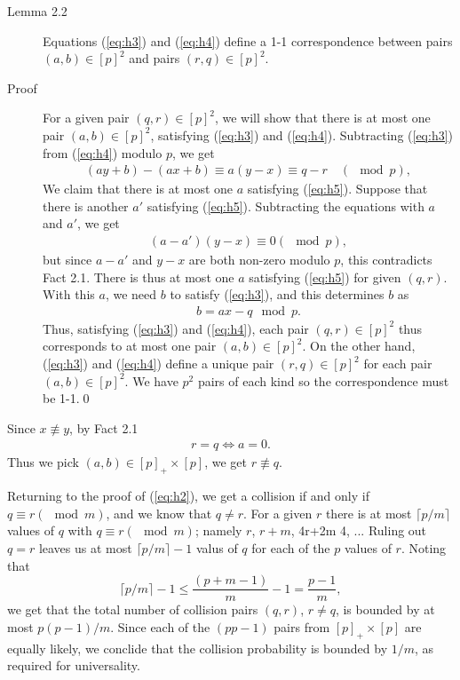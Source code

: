 \begin{description}
\item[Lemma 2.2] Equations (\ref{eq:h3}) and (\ref{eq:h4}) define a 1-1
  correspondence between pairs $(a,b)\in [p]^2$ and pairs $(r,q)\in[p]^2$.
\item[Proof] For a given pair $(q,r) \in [p]^2$, we will show that there is at
  most one pair $(a,b) \in [p]^2$, satisfying (\ref{eq:h3}) and (\ref{eq:h4}).
  Subtracting (\ref{eq:h3}) from (\ref{eq:h4}) modulo $p$, we get
  \begin{align}
    (ay+b) - (ax+b) \equiv a(y-x) \equiv q-r \quad (\mod p), \label{eq:h5}
  \end{align}
  We claim that there is at most one $a$ satisfying (\ref{eq:h5}). Suppose that
  there is another $a'$ satisfying (\ref{eq:h5}).  Subtracting the equations
  with $a$ and $a'$, we get
  \begin{align*}
    (a-a')(y-x) \equiv 0 (\mod p),
  \end{align*}
  but since $a-a'$ and $y-x$ are both non-zero modulo $p$, this contradicts Fact
  2.1. There is thus at most one $a$ satisfying (\ref{eq:h5}) for given
  $(q,r)$. With this $a$, we need $b$ to satisfy (\ref{eq:h3}), and this
  determines $b$ as
  \begin{align}
    b = ax-q\mod p. \label{eq:h6}
  \end{align}
  Thus, satisfying (\ref{eq:h3}) and (\ref{eq:h4}), each pair $(q,r)\in [p]^2$
  thus corresponds to at most one pair $(a,b)\in [p]^2$. On the other hand,
  (\ref{eq:h3}) and (\ref{eq:h4}) define a unique pair $(r,q)\in[p]^2$ for each
  pair $(a,b)\in [p]^2$. We have $p^2$ pairs of each kind so the correspondence
  must be 1-1.\qed
\end{description}

Since $x \not\equiv y$, by Fact 2.1
\begin{align}
  r = q \Longleftrightarrow a = 0. \label{eq:h7}
\end{align}
Thus we pick $(a,b) \in [p]_+ \times [p]$, we get $r \not\equiv q$.

Returning to the proof of (\ref{eq:h2}), we get a collision if and only if $q
\equiv r (\mod m)$, and we know that $q \neq r$. For a given $r$ there is at
most $\lceil p/m\rceil$ values of $q$ with $q \equiv r (\mod m)$; namely $r$,
$r+m$, 4r+2m 4, ... Ruling out $q = r$ leaves us at most $\lceil p/m \rceil - 1$
valus of $q$ for each of the $p$ values of $r$. Noting that
\[
  \lceil p/m\rceil - 1 \leq  \frac{(p+m-1)}{m}-1 = \frac{p-1}{m},
\]
we get that the total number of collision pairs $(q,r)$, $r \neq q$, is bounded
by at most $p(p-1)/m$. Since each of the $(pp-1)$ pairs from $[p]_+ \times [p]$
are equally likely, we conclide that the collision probability is bounded by
$1/m$, as required for universality.
